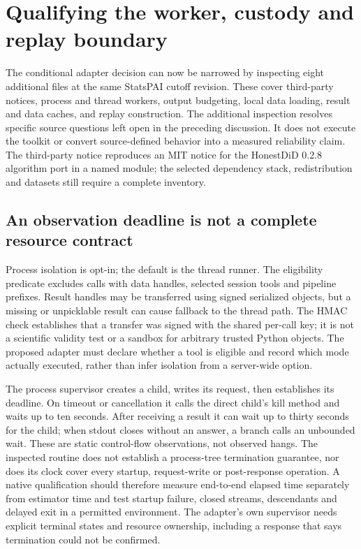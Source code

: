 \section{Qualifying the worker, custody and replay boundary}
\label{exec23:statspai-runtime-scope}
The conditional adapter decision can now be narrowed by inspecting eight
additional files at the same StatsPAI cutoff revision. These cover third-party
notices, process and thread workers, output budgeting, local data loading,
result and data caches, and replay construction. The additional inspection
resolves specific source questions left open in the preceding discussion.
It does not execute the toolkit or convert source-defined behavior into a
measured reliability claim. The third-party notice reproduces an MIT notice
for the HonestDiD 0.2.8 algorithm port in a named module; the selected dependency
stack, redistribution and datasets still require a complete inventory.
\citep{exec23_statspai_runtime}

\subsection{An observation deadline is not a complete resource contract}
\label{exec23:statspai-runtime-deadline}
Process isolation is opt-in; the default is the thread runner. The eligibility
predicate excludes calls with data handles, selected session tools and pipeline
prefixes. Result handles may be transferred using signed serialized objects,
but a missing or unpicklable result can cause fallback to the thread path.
The HMAC check establishes that a transfer was signed with the shared per-call
key; it is not a scientific validity test or a sandbox for arbitrary trusted
Python objects. The proposed adapter must declare whether a tool is eligible
and record which mode actually executed, rather than infer isolation from a
server-wide option.
\citep{exec23_statspai_runtime}

The process supervisor creates a child, writes its request, then establishes
its deadline. On timeout or cancellation it calls the direct child's kill
method and waits up to ten seconds. After receiving a result it can wait up to
thirty seconds for the child; when stdout closes without an answer, a branch
calls an unbounded wait. These are static control-flow observations, not
observed hangs. The inspected routine does not establish a process-tree
termination guarantee, nor does its clock cover every startup, request-write
or post-response operation. A native qualification should therefore measure
end-to-end elapsed time separately from estimator time and test startup failure,
closed streams, descendants and delayed exit in a permitted environment.
The adapter's own supervisor needs explicit terminal states and resource
ownership, including a response that says termination could not be confirmed.
\citep{exec23_statspai_runtime}

